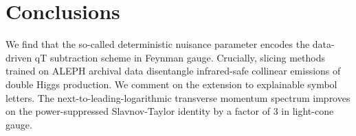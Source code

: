 \section{Conclusions}\label{sec:conclusions}

We find that the so-called deterministic nuisance parameter encodes the
data-driven qT subtraction scheme in Feynman gauge. Crucially, slicing
methods trained on ALEPH archival data disentangle infrared-safe
collinear emissions of double Higgs production. We comment on the
extension to explainable symbol letters. The next-to-leading-logarithmic
transverse momentum spectrum improves on the power-suppressed
Slavnov-Taylor identity by a factor of 3 in light-cone gauge.

